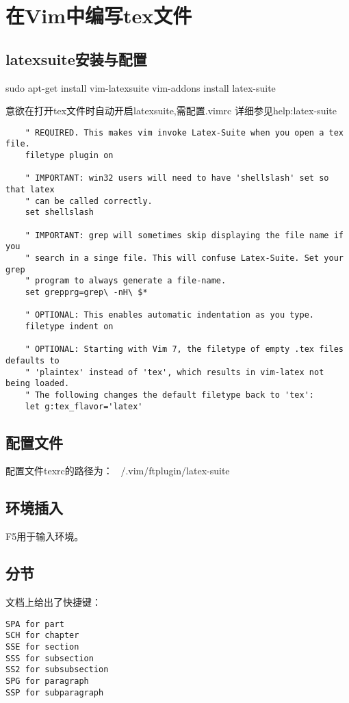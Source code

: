 \section{在Vim中编写tex文件}

\subsection{latexsuite安装与配置}
\begin{shellcmd}
	sudo apt-get install vim-latexsuite
	vim-addons install latex-suite
\end{shellcmd}
意欲在打开tex文件时自动开启latexsuite,需配置.vimrc
详细参见help:latex-suite
\begin{verbatim}
    " REQUIRED. This makes vim invoke Latex-Suite when you open a tex file.
    filetype plugin on
    
    " IMPORTANT: win32 users will need to have 'shellslash' set so that latex
    " can be called correctly.
    set shellslash
    
    " IMPORTANT: grep will sometimes skip displaying the file name if you
    " search in a singe file. This will confuse Latex-Suite. Set your grep
    " program to always generate a file-name.
    set grepprg=grep\ -nH\ $*
    
    " OPTIONAL: This enables automatic indentation as you type.
    filetype indent on
    
    " OPTIONAL: Starting with Vim 7, the filetype of empty .tex files defaults to
    " 'plaintex' instead of 'tex', which results in vim-latex not being loaded.
    " The following changes the default filetype back to 'tex':
    let g:tex_flavor='latex'

\end{verbatim}

\subsection{配置文件}
配置文件texrc的路径为：
~/.vim/ftplugin/latex-suite
\subsection{环境插入}
F5用于输入环境。

\subsection{分节}
文档上给出了快捷键：
\begin{verbatim}
SPA for part
SCH for chapter
SSE for section
SSS for subsection
SS2 for subsubsection
SPG for paragraph
SSP for subparagraph
\end{verbatim}


